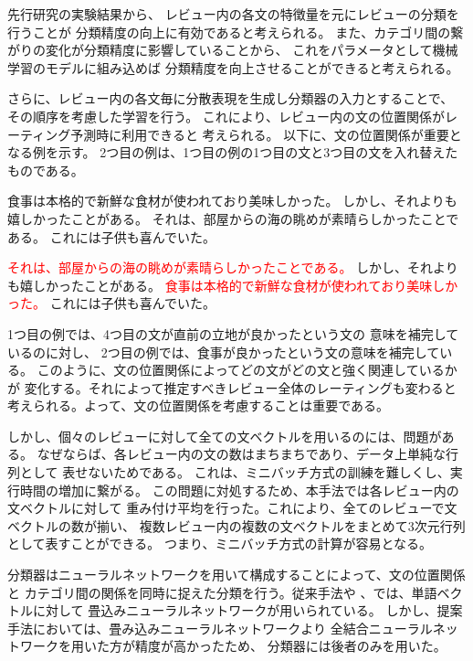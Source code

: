 \documentclass{ttithesis}
\begin{document}
先行研究\cite{fujitani15}の実験結果から、
レビュー内の各文の特徴量を元にレビューの分類を行うことが
分類精度の向上に有効であると考えられる。
また、カテゴリ間の繋がりの変化が分類精度に影響していることから、
これをパラメータとして機械学習のモデルに組み込めば
分類精度を向上させることができると考えられる。

さらに、レビュー内の各文毎に分散表現を生成し分類器の入力とすることで、
その順序を考慮した学習を行う。
これにより、レビュー内の文の位置関係がレーティング予測時に利用できると
考えられる。
以下に、文の位置関係が重要となる例を示す。
2つ目の例は、1つ目の例の1つ目の文と3つ目の文を入れ替えたものである。

\begin{addmargin}{8ex}
  \vspace{1em}
  食事は本格的で新鮮な食材が使われており美味しかった。
  しかし、それよりも嬉しかったことがある。
  それは、部屋からの海の眺めが素晴らしかったことである。
  これには子供も喜んでいた。
\end{addmargin}

\begin{addmargin}{8ex}
  \vspace{1em}
  \textcolor{red}{それは、部屋からの海の眺めが素晴らしかったことである。}
  しかし、それよりも嬉しかったことがある。
  \textcolor{red}{食事は本格的で新鮮な食材が使われており美味しかった。}
  これには子供も喜んでいた。
\end{addmargin}

1つ目の例では、4つ目の文が直前の立地が良かったという文の
意味を補完しているのに対し、
2つ目の例では、食事が良かったという文の意味を補完している。
このように、文の位置関係によってどの文がどの文と強く関連しているかが
変化する。それによって推定すべきレビュー全体のレーティングも変わると
考えられる。よって、文の位置関係を考慮することは重要である。

しかし、個々のレビューに対して全ての文ベクトルを用いるのには、問題がある。
なぜならば、各レビュー内の文の数はまちまちであり、データ上単純な行列として
表せないためである。
これは、ミニバッチ方式の訓練を難しくし、実行時間の増加に繋がる。
この問題に対処するため、本手法では各レビュー内の文ベクトルに対して
重み付け平均を行った。これにより、全てのレビューで文ベクトルの数が揃い、
複数レビュー内の複数の文ベクトルをまとめて3次元行列として表すことができる。
つまり、ミニバッチ方式の計算が容易となる。

分類器はニューラルネットワークを用いて構成することによって、文の位置関係と
カテゴリ間の関係を同時に捉えた分類を行う。従来手法\cite{nal14}や
\cite{rie14}、\cite{duyu15}では、単語ベクトルに対して
畳込みニューラルネットワークが用いられている。
しかし、提案手法においては、畳み込みニューラルネットワークより
全結合ニューラルネットワークを用いた方が精度が高かったため、
分類器には後者のみを用いた。
\end{document}
